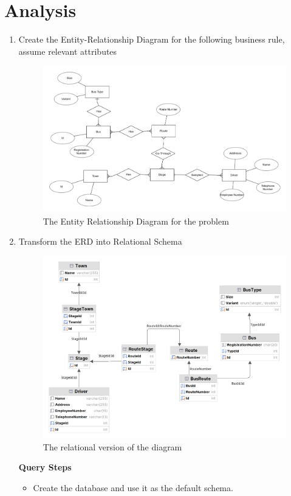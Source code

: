 \documentclass[12pt,titlepage]{article}
\begin{document}
\section{Analysis}
\begin{enumerate}[label=\alph*.)]
    \item {
        Create the Entity-Relationship Diagram for the following business rule, assume relevant attributes

        \begin{figure}[h]
            \centering
            \includegraphics[width=.65\textwidth]{./images/erdplus.png}
            \caption{The Entity Relationship Diagram for the problem}
        \end{figure}
    }
    \item {
        Transform the ERD into Relational Schema

        \begin{figure}[h]
            \centering
            \includegraphics[width=.65\textwidth]{./images/erd.png}
            \caption{The relational version of the diagram}
        \end{figure}

        \pagebreak

        \large{\textbf{Query Steps}}
        \begin{itemize}
            \item {
                Create the database and use it as the default schema.

}
\end{itemize}}
\end{enumerate}
\end{document}
